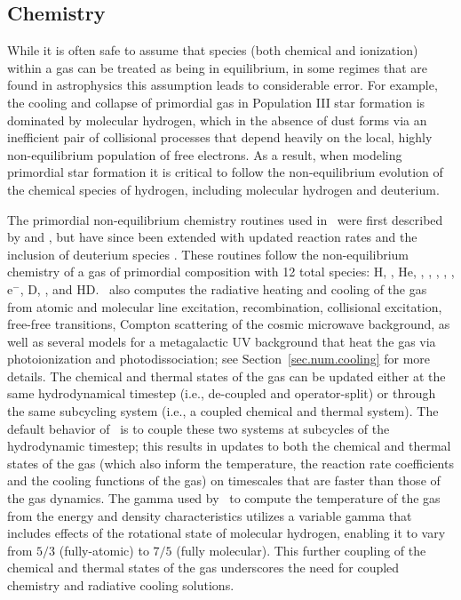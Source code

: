 \subsection{Chemistry}
\label{sec.num.chemistry}

While it is often safe to assume that species (both chemical and ionization)
within a gas can be treated as being in equilibrium, in some regimes that are
found in astrophysics this assumption leads to considerable error.  For
example, the cooling and collapse of primordial gas in Population III star
formation is dominated by molecular hydrogen, which in the absence of dust
forms via an inefficient pair of collisional processes that depend heavily on
the local, highly non-equilibrium population of free electrons.  As a result,
when modeling primordial star formation it is critical to follow the
non-equilibrium evolution of the chemical species of hydrogen, including
molecular hydrogen and deuterium.

The primordial non-equilibrium chemistry routines used in \enzo\ were first
described by \citet{abel97} and \citet{anninos97}, but have
since been extended with updated reaction rates and the inclusion of
deuterium species \citep{2009PhDT.........5T}.  These routines follow the
non-equilibrium chemistry of a gas of primordial composition with 12 total
species: H, \Hp, He, \Hep, \Hepp, \Hm, \HHp, \HH, e$^-$, D, \Dp, and HD.  \enzo\
also computes the radiative heating and cooling of the gas from atomic and
molecular line excitation, recombination, collisional excitation, free-free
transitions, Compton scattering of the cosmic microwave background, as well as
several models for a metagalactic UV background that heat the gas via
photoionization and photodissociation; see Section~\ref{sec.num.cooling} for
more details.  The chemical and thermal states of the gas can be updated either
at the same hydrodynamical timestep (i.e., de-coupled and operator-split) or
through the same subcycling system (i.e., a coupled chemical and thermal
system).  The default behavior of \enzo\ is to couple these two systems at
subcycles of the hydrodynamic timestep; this results in updates to both the
chemical and thermal states of the gas (which also inform the temperature, the
reaction rate coefficients and the cooling functions of the gas) on timescales
that are faster than those of the gas dynamics.  The gamma used by \enzo\ to
compute the temperature of the gas from the energy and density characteristics
utilizes a variable gamma that includes effects of the rotational state of
molecular hydrogen, enabling it to vary from $5/3$ (fully-atomic) to $7/5$
(fully molecular).  This further coupling of the chemical and thermal states of
the gas underscores the need for coupled chemistry and radiative cooling
solutions.

